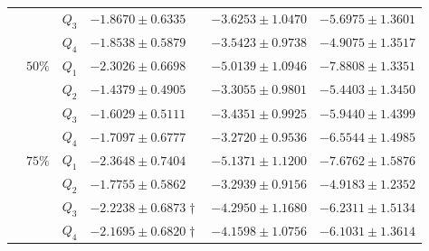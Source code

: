 \begin{table}[h]
{\begin{tabular}{@{}ccclll@{}}
 &  & $Q_{3}$ & $-1.8670 \pm 0.6335$ & $-3.6253 \pm 1.0470$ & $-5.6975 \pm 1.3601$ \\
 &  & $Q_{4}$ & $-1.8538 \pm 0.5879$ & $\mathbf{-3.5423 \pm 0.9738}$ & $-4.9075 \pm 1.3517$ \\ \cmidrule(l){2-6} 
 & $50\%$ & $Q_{1}$ & $-2.3026 \pm 0.6698$ & $-5.0139 \pm 1.0946$ & $-7.8808 \pm 1.3351$ \\
 &  & $Q_{2}$ & $\mathbf{-1.4379 \pm 0.4905}$ & $-3.3055 \pm 0.9801$ & $\mathbf{-5.4403 \pm 1.3450}$ \\
 &  & $Q_{3}$ & $-1.6029 \pm 0.5111$ & $-3.4351 \pm 0.9925$ & $-5.9440 \pm 1.4399$ \\
 &  & $Q_{4}$ & $-1.7097 \pm 0.6777$ & $\mathbf{-3.2720 \pm 0.9536}$ & $-6.5544 \pm 1.4985$ \\ \cmidrule(l){2-6} 
 & $75\%$ & $Q_{1}$ & $-2.3648 \pm 0.7404$ & $-5.1371 \pm 1.1200$ & $-7.6762 \pm 1.5876$ \\
 &  & $Q_{2}$ & $\mathbf{-1.7755 \pm 0.5862}$ & $\mathbf{-3.2939 \pm 0.9156}$ & $\mathbf{-4.9183 \pm 1.2352}$ \\
 &  & $Q_{3}$ & $-2.2238 \pm 0.6873\dagger$ & $-4.2950 \pm 1.1680$ & $-6.2311 \pm 1.5134$ \\
 &  & $Q_{4}$ & $-2.1695 \pm 0.6820\dagger$ & $-4.1598 \pm 1.0756$ & $-6.1031 \pm 1.3614$ \\ \bottomrule
\end{tabular}%
}
\end{table}

